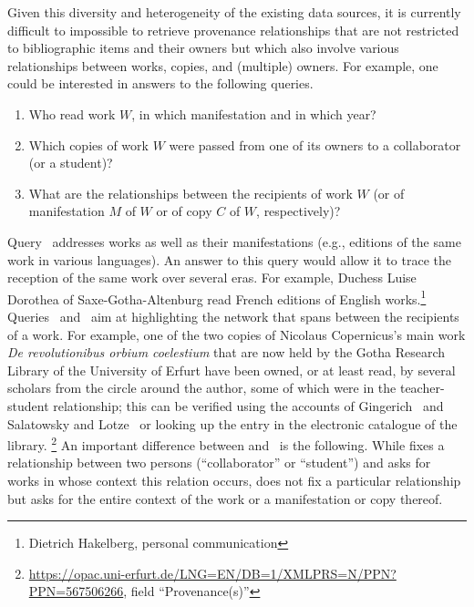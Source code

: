 Given this diversity and heterogeneity of the existing data sources,
it is currently difficult to impossible to retrieve provenance relationships
that are not restricted to bibliographic items and their owners
but which also involve various relationships between works, copies, and (multiple) owners.
For example, one could be interested in answers to the following queries.
%
\begin{enumerate}
  \item[\exaquery{1}]
    Who read work $W$, in which manifestation and in which year?
  \item[\exaquery{2}]
    Which copies of work $W$ were passed from one of its owners to a collaborator (or a student)?
  \item[\exaquery{3}]
    What are the relationships between the recipients of work $W$
    (or of manifestation $M$ of $W$ or of copy $C$ of $W$, respectively)?
\end{enumerate}
%
Query~ addresses works as well as their manifestations
(e.g., editions of the same work in various languages).
An answer to this query would allow it to trace the reception
of the same work over several eras. For example, Duchess Luise Dorothea of Saxe-Gotha-Altenburg
read French editions of English works.\footnote{Dietrich Hakelberg, personal communication}
%
Queries~ and~
aim at highlighting the network
that spans between the recipients of a work.
For example, one of the two copies of Nicolaus Copernicus's
main work \emph{De revolutionibus orbium coelestium} \autocite{Kopernikus1543}
that are now held by the Gotha Research Library of the University of Erfurt
have been owned, or at least read, by several scholars
from the circle around the author,
some of which were in the teacher-student relationship;
this can be verified using the accounts of Gingerich~\autocite[p.\,69]{Gingerich2002}
and Salatowsky and Lotze~\autocite[p.\,142]{Salatowsky2015}
or looking up the entry in the electronic catalogue of the library.%
\footnote{\url{https://opac.uni-erfurt.de/LNG=EN/DB=1/XMLPRS=N/PPN?PPN=567506266}, field ``Provenance(s)''}
%
An important difference between  and~ is the following.
While  fixes a relationship between two persons (``collaborator'' or ``student'')
and asks for works in whose context this relation occurs,
 does not fix a particular relationship but asks for the entire context of
the work or a manifestation or copy thereof.

  

